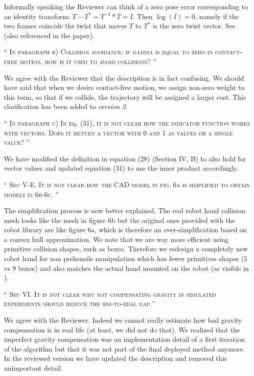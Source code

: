 \documentclass[10pt]{article}
\newcommand{\referee}[1]{\;
  \begin{minipage}[t]{.95\textwidth}
    ``{\small\color{red} \textsc{#1}}''
  \end{minipage}\medskip
  }
\newcommand{\version}[1]{\textit{version #1}}
\begin{document}
\begin{enumerate}[label={[R7:\,\arabic{enumi}]}]
Informally speaking the Reviewer can think of a zero pose error corresponding to an identity transform:  $T - T^* = T^{-1} * T = I$. Then $\log(I)=0$, namely if the two frames coincide the twist that moves $T$ to $T^*$ is the zero twist vector. See \cite{blanco2010tutorial} (also referenced in the paper).


\item\label{reply:R7:36} 
\referee{In paragraph b) Collision avoidance: if gamma is equal to zero in contact-free motion, how is it used to avoid collisions?
}

We agree with the Reviewer that the description is in fact confusing. We should have said that when we desire contact-free motion, we assign non-zero weight to this term, so that if we collide, the trajectory will be assigned a larger cost. This clarification has been added to \version{2}.


\item\label{reply:R7:37} 
\referee{In paragraph c) In eq. (31), it is not clear how the indicator function works with vectors. Does it return a vector with 0 and 1 as values or a single value? }

We have modified the definition in equation (28) (Section IV, B) to also hold for vector values and updated equation (31) to use the inner product accordingly. 



\item\label{reply:R7:38} 
\referee{Sec V-E. It is not clear how the CAD model in fig. 6a is simplified to obtain models in 6b-6c.
}

The simplification process is now better explained. The real robot hand collision mesh looks like the mesh in figure 6b but the original ones provided with the robot library are like figure 6a, which is therefore an over-simplification based on a convex hull approximation. We note that we are way more efficient using primitive collision shapes, such as boxes. Therefore we redesign a completely new robot hand for non prehensile manipulation which has fewer primitives shapes (3 vs 9 boxes) and also matches the actual hand mounted on the robot (as visible in ).


\item\label{reply:R7:39} 
\referee{Sec VI. It is not clear why not compensating gravity in simulated experiments should reduce the sim-to-real gap.}

We agree with the Reviewer. Indeed we cannot really estimate how bad gravity compensation is in real life (at least, we did not do that). We realized that the imperfect gravity compensation was an implementation detail of a first iteration of the algorithm but that it was not part of the final deployed method anymore. In the reviewed version we have updated the description and removed this unimportant detail.

\end{enumerate}

\appendix


% 

\end{document}
